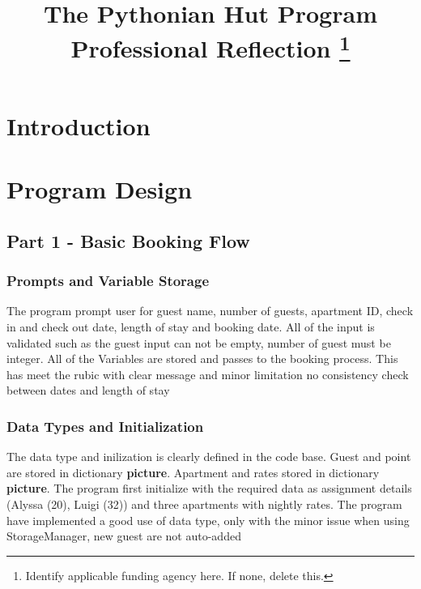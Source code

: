 \documentclass[conference]{IEEEtran}
\begin{document}
\title{The Pythonian Hut Program\\
{\footnotesize Professional Reflection}
\thanks{Identify applicable funding agency here. If none, delete this.}
}

\author{

}

\maketitle

\section{Introduction}


\section{Program Design}
\subsection{Part 1 - Basic Booking Flow}
\subsubsection{Prompts and Variable Storage}
The program prompt user for guest name, number of guests, apartment ID, check in and check out date, length of stay and booking date. All of the input is validated such as the guest input can not be empty, number of guest must be integer. All of the Variables are stored and passes to the booking process. This has meet the rubic with clear message and minor limitation no consistency check between dates and length of stay 
\subsubsection{Data Types and Initialization}
The data type and inilization is clearly defined in the code base. Guest and point are stored in dictionary \textbf{picture}. Apartment and rates stored in dictionary \textbf{picture}. The program first initialize with the required data as assignment details (Alyssa (20), Luigi (32)) and three apartments with nightly rates. The program have implemented a good use of data type, only with the minor issue when using StorageManager, new guest are not auto-added
\end{document}
